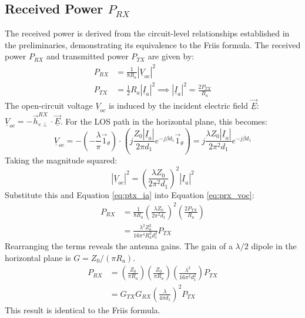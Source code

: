 \subsection{Received Power $P_{RX}$}
The received power is derived from the circuit-level relationships established in the preliminaries, demonstrating its equivalence to the Friis formula.
The received power $P_{RX}$ and transmitted power $P_{TX}$ are given by:
\begin{align}
	P_{RX} &= \frac{1}{8R_a}|\underline{V}_{oc}|^2 \label{eq:prx_voc} \\
	P_{TX} &= \frac{1}{2}R_a|\underline{I}_{a}|^2 \implies |\underline{I}_{a}|^2 = \frac{2P_{TX}}{R_a} \label{eq:ptx_ia}
\end{align}
The open-circuit voltage $\underline{V}_{oc}$ is induced by the incident electric field $\underline{\vec{E}}$: $\underline{V}_{oc} = -\vec{h}_{e\perp}^{RX} \cdot \underline{\vec{E}}$. For the LOS path in the horizontal plane, this becomes:
\begin{equation}
	\underline{V}_{oc} = -\left(-\frac{\lambda}{\pi}\vec{1}_\theta\right) \cdot \left(j \frac{Z_0 |\underline{I}_a|}{2\pi d_1} e^{-j\beta d_1} \vec{1}_\theta\right) = j \frac{\lambda Z_0 |\underline{I}_a|}{2\pi^2 d_1} e^{-j\beta d_1}
\end{equation}
Taking the magnitude squared:
\begin{equation}
	|\underline{V}_{oc}|^2 = \left(\frac{\lambda Z_0}{2\pi^2 d_1}\right)^2 |\underline{I}_a|^2
\end{equation}
Substitute this and Equation \ref{eq:ptx_ia} into Equation \ref{eq:prx_voc}:
\begin{align}
	P_{RX} &= \frac{1}{8R_a} \left(\frac{\lambda Z_0}{2\pi^2 d_1}\right)^2 \left(\frac{2P_{TX}}{R_a}\right) \\
	&= \frac{\lambda^2 Z_0^2}{16\pi^4 R_a^2 d_1^2} P_{TX}
\end{align}
Rearranging the terms reveals the antenna gains. The gain of a $\lambda/2$ dipole in the horizontal plane is $G = Z_0/(\pi R_a)$.
\begin{align}
	P_{RX} &= \left( \frac{Z_0}{\pi R_a} \right) \left( \frac{Z_0}{\pi R_a} \right) \left( \frac{\lambda^2}{16\pi^2 d_1^2} \right) P_{TX} \\
	&= G_{TX} G_{RX} \left( \frac{\lambda}{4\pi d_1} \right)^2 P_{TX} \label{eq:los_power_final}
\end{align}
This result is identical to the Friis formula.

